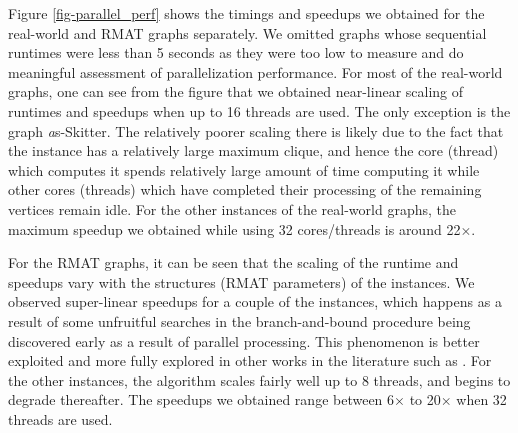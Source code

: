Figure \ref{fig-parallel_perf} shows the timings and speedups we obtained for the real-world and RMAT graphs separately. We omitted graphs whose sequential runtimes were less than 5 seconds as they were too low to measure and do meaningful assessment of parallelization performance. For most of the real-world graphs, one can see from the figure that we obtained near-linear scaling of runtimes and speedups when up to 16 threads are used. The only exception is the graph 
{\emph as-Skitter}. The relatively poorer scaling there is likely due to the fact that the instance has a relatively large maximum clique, and hence the core (thread) which computes it spends relatively large amount of time computing it while other cores (threads) which have completed their processing of the remaining vertices remain idle. 
For the other instances of the real-world graphs, the maximum speedup we obtained 
while using 32 cores/threads is around 22$\times$. 

For the RMAT graphs, it can be seen that the scaling of the runtime and speedups vary with the structures (RMAT parameters) of the instances. We observed super-linear speedups for a couple of the instances, which
happens as a result of some unfruitful searches in the branch-and-bound procedure being discovered early
as a result of parallel processing. This phenomenon is better exploited and more fully explored in other works in the literature such as  \cite{a6040618}. 
For the other instances, the algorithm scales fairly well up to 8 threads, and begins to
degrade thereafter. The speedups we obtained range between 6$\times$  to 20$\times$ when 32 threads are used.









